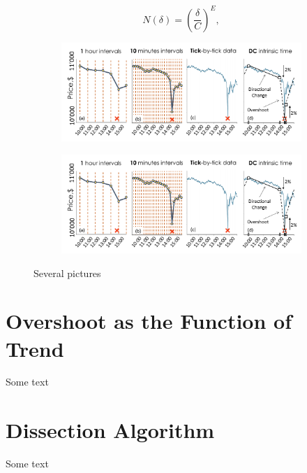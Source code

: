 %
\begin{equation}
    N(\delta) = \left( \frac{\delta}{C} \right)^{E},
\end{equation}
%

\begin{figure}[h!]
\centering
    \begin{subfigure}{0.45\textwidth}
        \includegraphics[width=0.9\linewidth]{uzh-thesis-master/chapters/article_1/Pictures/Flash_crash.pdf}
        \caption{}
        \label{art1:fig:acf_returns}
    \end{subfigure}
    \begin{subfigure}{0.45\textwidth}
        \includegraphics[width=0.9\linewidth]{uzh-thesis-master/chapters/article_1/Pictures/Flash_crash.pdf}
        \caption{}
        \label{art1:fig:acf_absolute_returns}
    \end{subfigure}
    \caption[]{Several pictures}
    \label{art1:fig:ACF_properties}
\end{figure}


 
\begin{subappendices}
\newpage
\section{Overshoot as the Function of Trend}
\label{art1:appendix:OvershootTrend}
Some text

\section{Dissection Algorithm}
\label{art1:appendix:DissectAlgo}
Some text
 
\end{subappendices}
 
 
\clearpage

